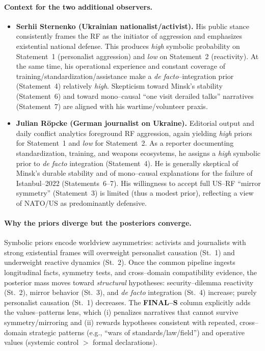 \documentclass[11pt,a4paper]{article}
\begin{document}
\paragraph{Context for the two additional observers.}
\begin{itemize}
    \item \textbf{Serhii Sternenko (Ukrainian nationalist/activist).} His public stance consistently frames the RF as the initiator of aggression and emphasizes existential national defense. This produces \emph{high} symbolic probability on Statement~1 (personalist aggression) and \emph{low} on Statement~2 (reactivity). At the same time, his operational experience and constant coverage of training/standardization/assistance make a \emph{de facto}–integration prior (Statement~4) relatively \emph{high}. Skepticism toward Minsk’s stability (Statement~6) and toward mono–causal “one visit derailed talks” narratives (Statement~7) are aligned with his wartime/volunteer praxis.
    \item \textbf{Julian Röpcke (German journalist on Ukraine).} Editorial output and daily conflict analytics foreground RF aggression, again yielding \emph{high} priors for Statement~1 and \emph{low} for Statement~2. As a reporter documenting standardization, training, and weapons ecosystems, he assigns a \emph{high} symbolic prior to \emph{de facto} integration (Statement~4). He is generally skeptical of Minsk’s durable stability and of mono–causal explanations for the failure of Istanbul–2022 (Statements~6–7). His willingness to accept full US–RF “mirror symmetry” (Statement~3) is limited (thus a modest prior), reflecting a view of NATO/US as predominantly defensive.
\end{itemize}

\paragraph{Why the priors diverge but the posteriors converge.}
Symbolic priors encode worldview asymmetries: activists and journalists with strong existential frames will overweight personalist causation (St.~1) and underweight reactive dynamics (St.~2). Once the common pipeline ingests longitudinal facts, symmetry tests, and cross–domain compatibility evidence, the posterior mass moves toward \emph{structural} hypotheses: security–dilemma reactivity (St.~2), mirror behavior (St.~3), and \emph{de facto} integration (St.~4) increase; purely personalist causation (St.~1) decreases. The \textbf{FINAL–S} column explicitly adds the values–patterns lens, which (i) penalizes narratives that cannot survive symmetry/mirroring and (ii) rewards hypotheses consistent with repeated, cross–domain strategic patterns (e.g., “wars of standards/law/field”) and operative values (systemic control $>$ formal declarations).
\end{document}
